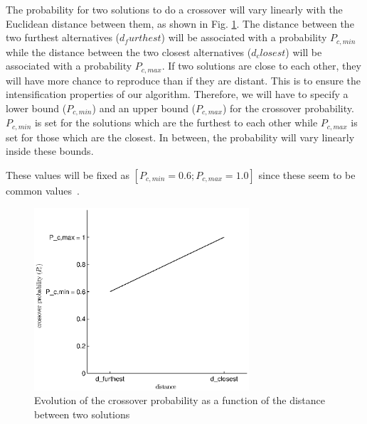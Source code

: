
The probability for two solutions to do a crossover will vary linearly with the Euclidean distance between them, as shown in Fig. \ref{fig:cross_proba}. The distance between the two furthest alternatives ($d_furthest$) will be associated with a probability $P_{c, min}$ while the distance between the two closest alternatives ($d_closest$) will be associated with a probability $P_{c, max}$. If two solutions are close to each other, they will have more chance to reproduce than if they are distant. This is to ensure the intensification properties of our algorithm. Therefore, we will have to specify a lower bound ($P_{c, min}$) and an upper bound ($P_{c, max}$) for the crossover probability. $P_{c, min}$ is set for the solutions which are the furthest to each other while $P_{c, max}$ is set for those which are the closest. In between, the probability will vary linearly inside these bounds.

These values will be fixed as $[P_{c, min} = 0.6; P_{c, max} = 1.0]$ since these seem to be common values~\cite{Davis1989}.

\begin{figure}[h!]
\begin{center}
\includegraphics[width=8cm]{crossover_proba.eps}
\end{center}
\vspace{-0.5cm}
\caption{Evolution of the crossover probability as a function of the distance between two solutions}
\begin{center}
\end{center}
\label{fig:cross_proba}
\end{figure}

